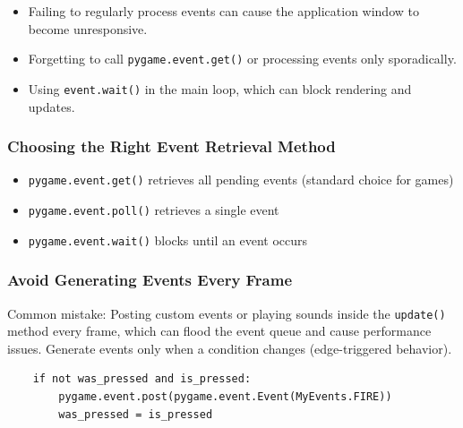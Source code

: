 \begin{warningbox}
	\begin{itemize}
		\item Failing to regularly process events can cause the application window to become unresponsive.
		\item Forgetting to call \texttt{pygame.event.get()} or processing events only sporadically.
		\item  Using \texttt{event.wait()} in the main loop, which can block rendering and updates.
	\end{itemize}
\end{warningbox}


\subsubsection{Choosing the Right Event Retrieval Method}

\begin{hintbox}
\begin{itemize}
	\item \texttt{pygame.event.get()} retrieves all pending events (standard choice for games)
	\item \texttt{pygame.event.poll()} retrieves a single event
	\item \texttt{pygame.event.wait()} blocks until an event occurs
\end{itemize}
\end{hintbox}

\subsubsection{Avoid Generating Events Every Frame}

\begin{warningbox}
	Common mistake: Posting custom events or playing sounds inside the \texttt{update()} method every frame, which can flood the event queue and cause performance issues. Generate events only when a condition changes (edge-triggered behavior).
\end{warningbox}


\lstset{firstnumber=1}
\begin{lstlisting}
	if not was_pressed and is_pressed:
		pygame.event.post(pygame.event.Event(MyEvents.FIRE))
		was_pressed = is_pressed
\end{lstlisting}


